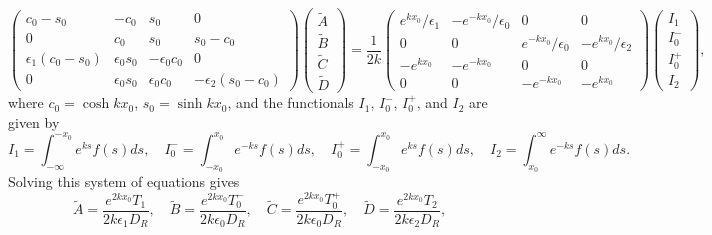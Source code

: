 \documentclass{aastex61}
\begin{document}
\begin{equation}
\left(
\begin{matrix}
c_0-s_0              &-c_0           &s_0              &0                   \\
0                    &c_0            &s_0              &s_0-c_0           \\
\epsilon_1(c_0-s_0)  &\epsilon_0s_0  &-\epsilon_0c_0   &0                   \\
0                    &\epsilon_0s_0  &\epsilon_0c_0    &-\epsilon_2(s_0-c_0)
\end{matrix}
\right)
\left(
\begin{matrix}
\tilde{A} \\
\tilde{B} \\
\tilde{C} \\
\tilde{D}
\end{matrix}
\right)
=
\frac{1}{2k}
\left(
\begin{matrix}
e^{kx_0}/\epsilon_1  & -e^{-kx_0}/\epsilon_0  & 0                      & 0                   \\
0                    & 0                      & e^{-kx_0}/\epsilon_0   & -e^{kx_0}/\epsilon_2 \\
-e^{kx_0} & -e^{-kx_0}  & 0                      & 0                   \\
0                    & 0                      & -e^{-kx_0}  & -e^{kx_0}
\end{matrix}
\right)
\left(
\begin{matrix}
I_1    \\
I_0^- \\
I_0^+ \\
I_2
\end{matrix}
\right),
\label{coefmatrix}
\end{equation}
where $c_0 = \cosh{kx_0}$, $s_0 = \sinh{kx_0}$, and the functionals $I_1$, $I_0^-$, $I_0^+$, and $I_2$ are given by
\begin{equation}
I_1 = \int_{-\infty}^{-x_0} e^{ks}f(s) ds, \quad I_0^- = \int_{-x_0}^{x_0} e^{-ks}f(s) ds, \quad I_0^+ = \int_{-x_0}^{x_0} e^{ks}f(s) ds, \quad I_2  = \int_{x_0}^{\infty} e^{-ks}f(s) ds.
\end{equation}
Solving this system of equations gives
\newcommand{\e}{\epsilon}
\begin{equation}
\tilde{A} = \frac{e^{2kx_0}T_1}{2k\e_1D_R}, 
\quad 
\tilde{B} = \frac{e^{2kx_0}T_0^-}{2k\e_0D_R}, 
\quad 
\tilde{C} = \frac{e^{2kx_0}T_0^+}{2k\e_0D_R}, 
\quad 
\tilde{D} = \frac{e^{2kx_0}T_2}{2k\e_2D_R},
\label{consts}
\end{equation}
\end{document}
